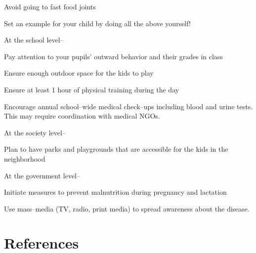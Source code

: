  \item Avoid going to fast food joints

 \item Set an example for your child by doing all the above yourself!

At the school level–

\item Pay attention to your pupils’ outward behavior and their grades in class

 \item Ensure enough outdoor space for the kids to play

 \item Ensure at least 1 hour of physical training during the day

 \item Encourage annual school–wide medical check–ups including blood and urine tests. This may require coordination with medical NGOs.

At the society level–

\item Plan to have parks and playgrounds that are accessible for the kids in the neighborhood

At the government level–

\item Initiate measures to prevent malnutrition during pregnancy and lactation

 \item Use mass–media (TV, radio, print media) to spread awareness about the disease.



\section*{References}

